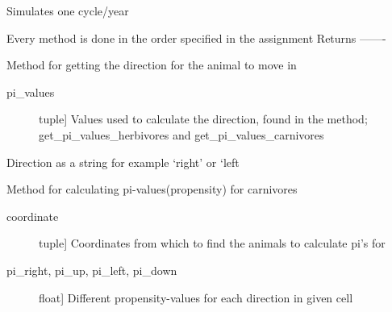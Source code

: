\documentclass[a4paper,10pt,english]{sphinxmanual}
\begin{document}
\begin{fulllineitems}

\begin{fulllineitems}
\label{\detokenize{island:biosim.island.Island.cycle}}
Simulates one cycle/year

Every method is done in the order specified in the assignment
Returns
-------

\end{fulllineitems}


\begin{fulllineitems}
\label{\detokenize{island:biosim.island.Island.get_direction}}
Method for getting the direction for the animal to move in
\begin{description}
\item[{pi\_values}] \leavevmode{[}tuple{]}
Values used to calculate the direction, found in the method;
get\_pi\_values\_herbivores and get\_pi\_values\_carnivores

\end{description}

Direction as a string for example `right' or `left

\end{fulllineitems}


\begin{fulllineitems}
\label{\detokenize{island:biosim.island.Island.get_pi_values_carnivores}}
Method for calculating pi-values(propensity) for carnivores
\begin{description}
\item[{coordinate}] \leavevmode{[}tuple{]}
Coordinates  from which to find the animals to calculate pi's for

\end{description}
\begin{description}
\item[{pi\_right, pi\_up, pi\_left, pi\_down}] \leavevmode{[}float{]}
Different propensity-values for each direction in given cell

\end{description}


\end{fulllineitems}
\end{fulllineitems}
\end{document}
